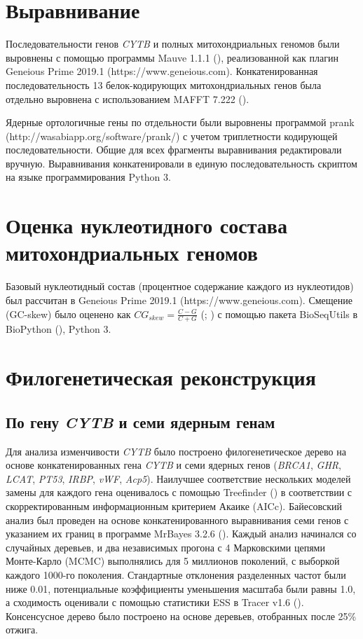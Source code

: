 \section{Выравнивание}

Последовательности генов \textit{CYTB} и полных митохондриальных геномов были выровнены с помощью программы Mauve 1.1.1 (\cite{Darling2004}), реализованной как плагин Geneious Prime 2019.1 (https://www.geneious.com). Конкатенированная последовательность 13 белок-кодирующих митохондриальных генов была отдельно выровнена с использованием MAFFT 7.222 (\cite{Katoh2014}).

Ядерные ортологичные гены по отдельности были выровнены программой prank (http://wasabiapp.org/software/prank/) с учетом триплетности кодирующей последовательности. Общие для всех фрагменты выравнивания редактировали вручную. Выравнивания конкатенировали в единую последовательность скриптом на языке программирования Python 3.

\section{Оценка нуклеотидного состава митохондриальных геномов}

Базовый нуклеотидный состав (процентное содержание каждого из нуклеотидов) был рассчитан в Geneious Prime 2019.1 (https://www.geneious.com). Смещение (GC-skew) было оценено как $CG_{skew} = \frac{C - G}{C + G}$ (\cite{Arabi2010}; \cite{Hassanin2005}) с помощью пакета BioSeqUtils в BioPython (\cite{Cock2009}), Python 3.   

\section{Филогенетическая реконструкция}

\subsection{По гену \textit{CYTB} и семи ядерным генам}

Для анализа изменчивости \textit{CYTB} было построено филогенетическое дерево на основе конкатенированных гена \textit{CYTB} и семи ядерных генов (\textit{BRCA1}, \textit{GHR}, \textit{LCAT}, \textit{PT53}, \textit{IRBP}, \textit{vWF}, \textit{Acp5}). Наилучшее соответствие нескольких моделей замены для каждого гена оценивалось с помощью Treefinder (\cite{Jobb2004}) в соответствии с скорректированным информационным критерием Акаике (AICc). Байесовский анализ был проведен на основе конкатенированного выравнивания семи генов с указанием их границ в программе MrBayes 3.2.6 (\cite{Ronquist2012}). Каждый анализ начинался со случайных деревьев, и два независимых прогона с 4 Марковскими цепями Монте-Карло (MCMC) выполнялись для 5 миллионов поколений, с выборкой каждого 1000-го поколения. Стандартные отклонения разделенных частот были ниже 0.01, потенциальные коэффициенты уменьшения масштаба были равны 1.0, а сходимость оценивали с помощью статистики ESS в Tracer v1.6 (\cite{Rambaut2014}). Консенсусное дерево было построено на основе деревьев, отобранных после 25\% отжига.

